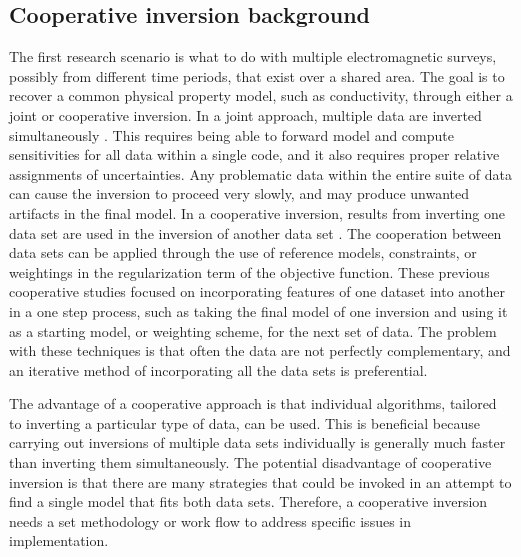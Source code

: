 \documentclass[letterpaper,11pt]{article}
\begin{document}
\subsection{Cooperative inversion background} 
The first research scenario is what to do with multiple electromagnetic surveys, possibly from different time periods, that exist over a shared area.  The goal is to recover a common physical property model, such as conductivity, through either a joint or cooperative inversion. In a joint approach, multiple data are inverted simultaneously \cite[]{Vozoff1975, Haber1997, Albouy2001, Gallardo2004, Sosa2013}. This requires being able to forward model and compute sensitivities for all data within a single code, and it also requires proper relative assignments of uncertainties. Any problematic data within the entire suite of data can cause the inversion to proceed very slowly, and may produce unwanted artifacts in the final model. In a cooperative inversion, results from inverting one data set are used in the inversion of another data set \cite[]{Lines1988, Oldenburg1997, Commer2009}. The cooperation between data sets can be applied through the use of reference models, constraints, or weightings in the regularization term of the objective function. These previous cooperative studies focused on incorporating features of one dataset into another in a one step process, such as taking the final model of one inversion and using it as a starting model, or weighting scheme, for the next set of data. The problem with these techniques is that often the data are not perfectly complementary, and an iterative method of incorporating all the data sets is preferential. 

The advantage of a cooperative approach is that individual algorithms, tailored to inverting a particular type of data, can be used.  This is beneficial because carrying out inversions of multiple data sets individually is generally much faster than inverting them simultaneously. The potential disadvantage of cooperative inversion is that there are many strategies that could be invoked in an attempt to find a single model that fits both data sets.  Therefore, a cooperative inversion needs a set methodology or work flow to address specific issues in implementation.  
\end{document}
